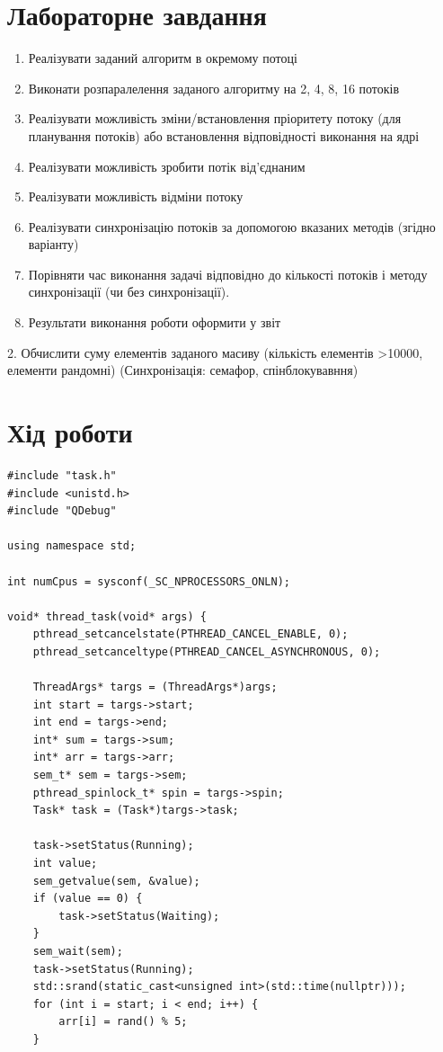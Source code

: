 \documentclass{article}
\begin{document}
\begin{normalsize}
	\section*{Лабораторне завдання}
	\begin{enumerate}
		\item Реалізувати заданий алгоритм в окремому потоці
		\item Виконати розпаралелення заданого алгоритму на 2, 4, 8, 16 потоків
		\item Реалізувати можливість зміни/встановлення пріоритету потоку (для
		планування потоків) або встановлення відповідності виконання на ядрі
		\item Реалізувати можливість зробити потік від’єднаним
		\item Реалізувати можливість відміни потоку
		\item Реалізувати синхронізацію потоків за допомогою вказаних методів
		(згідно варіанту)
		\item Порівняти час виконання задачі відповідно до кількості потоків і методу
		синхронізації (чи без синхронізації).
		\item Результати виконання роботи оформити у звіт
	\end{enumerate}
	\begin{center}
		2. Обчислити суму елементів заданого масиву (кількість елементів >10000,
		елементи рандомні) (Синхронізація: семафор, спінблокувавння)
	\end{center}

	\section*{Хід роботи}	
	\begin{lstlisting}
#include "task.h"
#include <unistd.h>
#include "QDebug"

using namespace std;

int numCpus = sysconf(_SC_NPROCESSORS_ONLN);

void* thread_task(void* args) {
	pthread_setcancelstate(PTHREAD_CANCEL_ENABLE, 0);
	pthread_setcanceltype(PTHREAD_CANCEL_ASYNCHRONOUS, 0);
	
	ThreadArgs* targs = (ThreadArgs*)args;
	int start = targs->start;
	int end = targs->end;
	int* sum = targs->sum;
	int* arr = targs->arr;
	sem_t* sem = targs->sem;
	pthread_spinlock_t* spin = targs->spin;
	Task* task = (Task*)targs->task;
	
	task->setStatus(Running);
	int value;
	sem_getvalue(sem, &value);
	if (value == 0) {
		task->setStatus(Waiting);
	}
	sem_wait(sem);
	task->setStatus(Running);
	std::srand(static_cast<unsigned int>(std::time(nullptr)));
	for (int i = start; i < end; i++) {
		arr[i] = rand() % 5;
	}
	

\end{lstlisting}
\end{normalsize}
\end{document}
